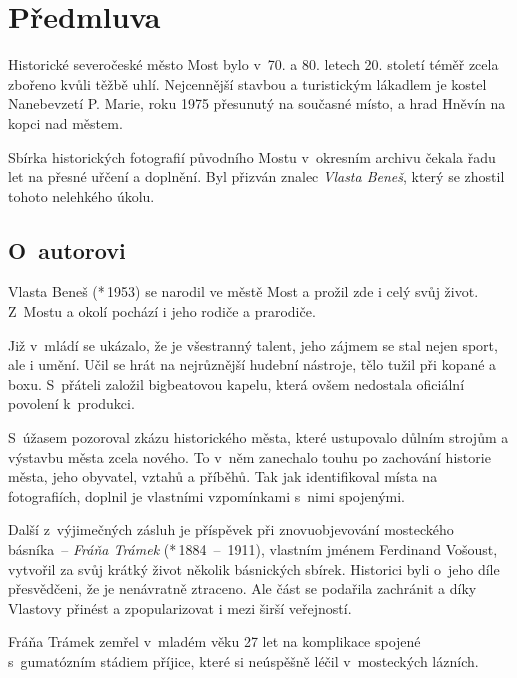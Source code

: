 
\chapter{Předmluva}

Historické severočeské město Most bylo v~70. a 80. letech 20. století téměř
zcela zbořeno kvůli těžbě uhlí. Nejcennější stavbou a turistickým lákadlem je
kostel Nanebevzetí P. Marie, roku 1975 přesunutý na současné místo, a hrad
Hněvín na kopci nad městem.

Sbírka historických fotografií původního Mostu v~okresním archivu čekala řadu
let na přesné uřčení a doplnění. Byl přizván znalec {\em Vlasta Beneš}, který
se zhostil tohoto nelehkého úkolu.

\section{O~autorovi}

Vlasta Beneš (*\,1953) se narodil ve městě Most a prožil zde i celý
svůj život. Z~Mostu a okolí pochází i jeho rodiče a prarodiče.


Již v~mládí se ukázalo, že je všestranný talent, jeho zájmem se stal nejen
sport, ale i umění. Učil se hrát na nejrůznější hudební nástroje, tělo tužil
při kopané a boxu. S~přáteli založil bigbeatovou kapelu, která ovšem nedostala
oficiální povolení k~produkci.

S~úžasem pozoroval zkázu historického města, které ustupovalo důlním strojům a
výstavbu města zcela nového. To v~něm zanechalo touhu po zachování historie
města, jeho obyvatel, vztahů a příběhů. Tak jak identifikoval místa na
fotografiích, doplnil je vlastními vzpomínkami s~nimi spojenými.

Další z~výjimečných zásluh je příspěvek při znovuobjevování mosteckého básníka~--
{\em Fráňa Trámek} (*\,1884~-- \dag{}\,1911), vlastním jménem Ferdinand Vošoust,
vytvořil za svůj krátký život několik básnických sbírek. Historici byli o~jeho
díle přesvědčeni, že je nenávratně ztraceno. Ale část se podařila zachránit a
díky Vlastovy přinést a zpopularizovat i mezi širší veřejností.

Fráňa Trámek zemřel v~mladém věku 27 let na komplikace spojené s~gumatózním
stádiem příjice, které si neúspěšně léčil v~mosteckých lázních.

\vlasta

\stopcolumns %

